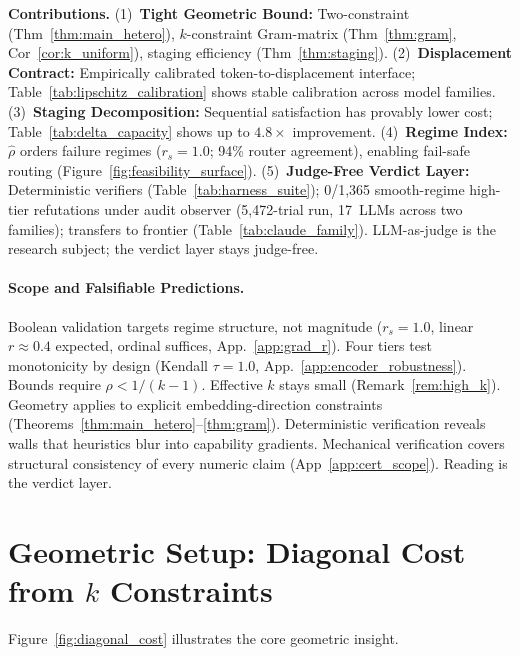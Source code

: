 \documentclass{article}
\theoremstyle{plain}
\theoremstyle{definition}
\theoremstyle{remark}
\newcommand{\rhohat}{\hat{\rho}}
\newcommand{\appref}[1]{App.~\ref{#1}}
\begin{document}
\noindent\textbf{Contributions.}
(1)~\textbf{Tight Geometric Bound:} Two-constraint (Thm~\ref{thm:main_hetero}), $k$-constraint Gram-matrix (Thm~\ref{thm:gram}, Cor~\ref{cor:k_uniform}), staging efficiency (Thm~\ref{thm:staging}).
(2)~\textbf{Displacement Contract:} Empirically calibrated token-to-displacement interface; Table~\ref{tab:lipschitz_calibration} shows stable calibration across model families.
(3)~\textbf{Staging Decomposition:} Sequential satisfaction has provably lower cost; Table~\ref{tab:delta_capacity} shows up to $4.8\times$ improvement.
(4)~\textbf{Regime Index:} $\rhohat$ orders failure regimes ($r_s{=}1.0$; 94\% router agreement), enabling fail-safe routing (Figure~\ref{fig:feasibility_surface}).
(5)~\textbf{Judge-Free Verdict Layer:} Deterministic verifiers (Table~\ref{tab:harness_suite}); 0/1{,}365 smooth-regime high-tier refutations under audit observer (5{,}472-trial run, 17~LLMs across two families); transfers to frontier (Table~\ref{tab:claude_family}). LLM-as-judge \citep{zheng2023judging} is the research subject; the verdict layer stays judge-free.

\paragraph{Scope and Falsifiable Predictions.}
Boolean validation targets regime structure, not magnitude ($r_s{=}1.0$, linear $r{\approx}0.4$ expected, ordinal suffices, \appref{app:grad_r}). Four tiers test monotonicity by design (Kendall $\tau{=}1.0$, \appref{app:encoder_robustness}). Bounds require $\rho < 1/(k{-}1)$. Effective $k$ stays small (Remark~\ref{rem:high_k}). Geometry applies to explicit embedding-direction constraints (Theorems~\ref{thm:main_hetero}--\ref{thm:gram}). Deterministic verification reveals walls that heuristics blur into capability gradients. Mechanical verification covers structural consistency of every numeric claim (App~\ref{app:cert_scope}). Reading is the verdict layer.

\section{Geometric Setup: Diagonal Cost from $k$ Constraints}\label{sec:setup}

Figure~\ref{fig:diagonal_cost} illustrates the core geometric insight.
\end{document}
